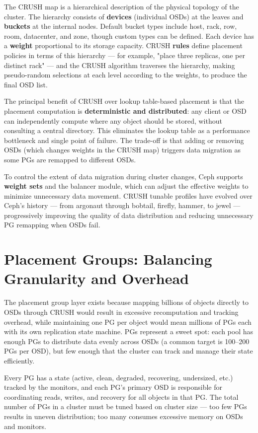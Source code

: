 The CRUSH map is a hierarchical description of the physical topology of the cluster. The hierarchy consists of \textbf{devices} (individual OSDs) at the leaves and \textbf{buckets} at the internal nodes. Default bucket types include host, rack, row, room, datacenter, and zone, though custom types can be defined. Each device has a \textbf{weight} proportional to its storage capacity. CRUSH \textbf{rules} define placement policies in terms of this hierarchy --- for example, "place three replicas, one per distinct rack" --- and the CRUSH algorithm traverses the hierarchy, making pseudo-random selections at each level according to the weights, to produce the final OSD list.

The principal benefit of CRUSH over lookup table-based placement is that the placement computation is \textbf{deterministic and distributed}: any client or OSD can independently compute where any object should be stored, without consulting a central directory. This eliminates the lookup table as a performance bottleneck and single point of failure. The trade-off is that adding or removing OSDs (which changes weights in the CRUSH map) triggers data migration as some PGs are remapped to different OSDs.

To control the extent of data migration during cluster changes, Ceph supports \textbf{weight sets} and the balancer module, which can adjust the effective weights to minimize unnecessary data movement. CRUSH tunable profiles have evolved over Ceph's history --- from argonaut through bobtail, firefly, hammer, to jewel --- progressively improving the quality of data distribution and reducing unnecessary PG remapping when OSDs fail.

\section{Placement Groups: Balancing Granularity and Overhead}
The placement group layer exists because mapping billions of objects directly to OSDs through CRUSH would result in excessive recomputation and tracking overhead, while maintaining one PG per object would mean millions of PGs each with its own replication state machine. PGs represent a sweet spot: each pool has enough PGs to distribute data evenly across OSDs (a common target is 100--200 PGs per OSD), but few enough that the cluster can track and manage their state efficiently.

Every PG has a state (active, clean, degraded, recovering, undersized, etc.) tracked by the monitors, and each PG's primary OSD is responsible for coordinating reads, writes, and recovery for all objects in that PG. The total number of PGs in a cluster must be tuned based on cluster size --- too few PGs results in uneven distribution; too many consumes excessive memory on OSDs and monitors.

